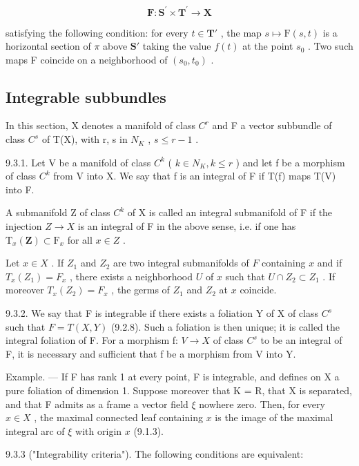 \[
\mathbf {F}: \mathbf {S} ^ {\prime} \times \mathbf {T} ^ {\prime} \rightarrow \mathbf {X}
\]

satisfying the following condition: for every \(t \in \mathbf{T}'\) , the map \(s \mapsto \mathrm{F}(s, t)\) is a horizontal section of \(\pi\) above \(\mathbf{S}'\) taking the value \(f(t)\) at the point \(s_0\) . Two such maps F coincide on a neighborhood of \((s_0, t_0)\) .

\subsection{Integrable subbundles}

In this section, X denotes a manifold of class \(C^{r}\) and F a vector subbundle of class \(C^{s}\) of T(X), with r, s in \(N_{K}\) , \(s \leqslant r - 1\) .

9.3.1. Let V be a manifold of class \(C^{k}\) ( \(k \in N_{K}, k \leqslant r\) ) and let f be a morphism of class \(C^{k}\) from V into X. We say that f is an integral of F if T(f) maps T(V) into F.

A submanifold Z of class \(C^{k}\) of X is called an integral submanifold of F if the injection \(Z \rightarrow X\) is an integral of F in the above sense, i.e. if one has \(\mathrm{T}_{x}(\mathbf{Z}) \subset \mathrm{F}_{x}\) for all \(x \in Z\) .

Let \(x \in X\) . If \(Z_1\) and \(Z_2\) are two integral submanifolds of \(F\) containing \(x\) and if \(T_x(Z_1) = F_x\) , there exists a neighborhood \(U\) of \(x\) such that \(U \cap Z_2 \subset Z_1\) . If moreover \(T_x(Z_2) = F_x\) , the germs of \(Z_1\) and \(Z_2\) at \(x\) coincide.

9.3.2. We say that F is integrable if there exists a foliation Y of X of class \(C^{s}\) such that \(F = T(X, Y)\) (9.2.8). Such a foliation is then unique; it is called the integral foliation of F. For a morphism f: \(V \to X\) of class \(C^{s}\) to be an integral of F, it is necessary and sufficient that f be a morphism from V into Y.

Example. --- If F has rank 1 at every point, F is integrable, and defines on X a pure foliation of dimension 1. Suppose moreover that K = R, that X is separated, and that F admits as a frame a vector field \(\xi\) nowhere zero. Then, for every \(x \in X\) , the maximal connected leaf containing \(x\) is the image of the maximal integral arc of \(\xi\) with origin \(x\) (9.1.3).

9.3.3 ("Integrability criteria"). The following conditions are equivalent:

